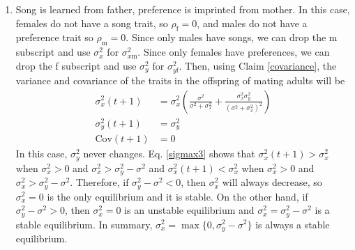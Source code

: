 \documentclass{article}
\newcommand{\x}[1]{\text{#1}}
\newcommand{\Cov}{\text{Cov}}
\begin{document}
\begin{enumerate}
\item Song is learned from father, preference is imprinted from mother. In this case, females do not have a song trait, so $\rho_\x{f}=0$, and males do not have a preference trait so $\rho_\x{m}=0$. Since only males have songs, we can drop the m subscript and use  $\sigma_x^2$ for $\sigma_{x\x{m}}^2$. Since only females have preferences, we can drop the f subscript and use $\sigma_y^2$ for $\sigma_{y\x{f}}^2$. Then, using Claim \ref{covariance}, the variance and covariance of the traits in the offspring of mating adults will be 
\begin{align}
\sigma_x^2(t+1)&=\sigma_x^2\left(\frac{\sigma^2}{\sigma^2+\sigma_x^2}+\frac{\sigma_x^2\sigma_y^2}{(\sigma^2+\sigma_x^2)^2}\right) \label{sigmax3}
\\ \sigma_y^2(t+1)&=\sigma_y^2 \label{sigmay3}
\\ \Cov(t+1)&=0
\end{align}
In this case, $\sigma_y^2$ never changes. Eq. \ref{sigmax3} shows that $\sigma_x^2(t+1)>\sigma_x^2$ when $\sigma_x^2>0$ and $\sigma_x^2>\sigma_y^2-\sigma^2$ and $\sigma_x^2(t+1)<\sigma_x^2$ when $\sigma_x^2>0$ and $\sigma_x^2>\sigma_y^2-\sigma^2$. Therefore, if $\sigma_y^2-\sigma^2<0$, then $\sigma_x^2$ will always decrease, so $\sigma_x^2=0$ is the only equilibrium and it is stable. On the other hand, if $\sigma_y^2-\sigma^2>0$, then $\sigma_x^2=0$ is an unstable equilibrium and $\sigma_x^2=\sigma_y^2-\sigma^2$ is a stable equilibrium. In summary, $\sigma_x^2=\max\{0,\sigma_y^2-\sigma^2\}$ is always a stable equilibrium.
 

\end{enumerate}
\end{document}
